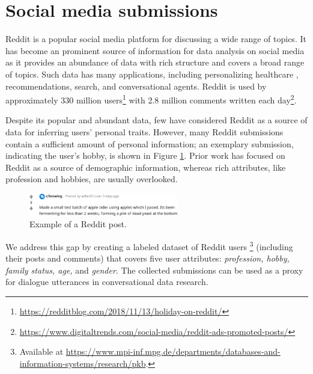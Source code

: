 
\section{Social media submissions}


Reddit is a popular social media platform for discussing a wide range of topics. It has become an prominent source of information for data analysis on social media as it provides an abundance of data with rich structure and covers a broad range of topics. Such data has many applications, including personalizing healthcare \cite{gyrard2018personalized}, recommendations, search, and conversational agents. 
Reddit is used by approximately 330 million users\footnote{{\scriptsize \url{https://redditblog.com/2018/11/13/holiday-on-reddit/}}}
with 2.8 million comments written each day\footnote{{\scriptsize \url{https://www.digitaltrends.com/social-media/reddit-ads-promoted-posts/}}}. 

Despite its popular and abundant data, few have considered Reddit as a source of data for inferring users' personal traits. However, many Reddit submissions contain a sufficient amount of personal information; an exemplary submission, indicating the user's hobby, is shown in Figure \ref{fig:input}. Prior work has focused on Reddit as a source of demographic information, whereas rich attributes, like profession and hobbies, are usually overlooked. 

\begin{figure}[th!]
\centering
\includegraphics[width=0.58\textwidth]{pics/brew.png}
\caption{
Example of a Reddit post.
}
\label{fig:input}
\end{figure}

We address this gap by creating a labeled dataset of Reddit users \footnote{Available at {\scriptsize \url{https://www.mpi-inf.mpg.de/departments/databases-and-information-systems/research/pkb}}.}
(including their posts and comments) that covers five user attributes: \textit{profession, hobby, family status, age,} and \emph{gender}. The collected submissions can be used as a proxy for dialogue utterances in conversational data research.


